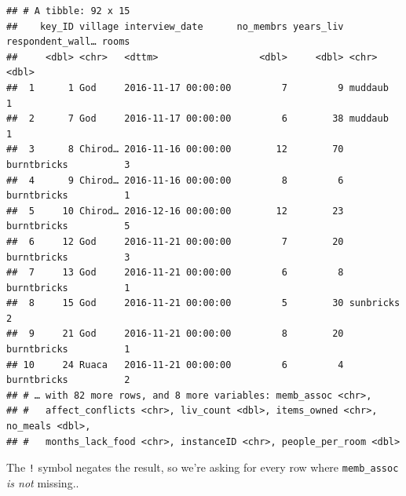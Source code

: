 \documentclass[]{book}
\begin{document}
\begin{verbatim}
## # A tibble: 92 x 15
##    key_ID village interview_date      no_membrs years_liv respondent_wall… rooms
##     <dbl> <chr>   <dttm>                  <dbl>     <dbl> <chr>            <dbl>
##  1      1 God     2016-11-17 00:00:00         7         9 muddaub              1
##  2      7 God     2016-11-17 00:00:00         6        38 muddaub              1
##  3      8 Chirod… 2016-11-16 00:00:00        12        70 burntbricks          3
##  4      9 Chirod… 2016-11-16 00:00:00         8         6 burntbricks          1
##  5     10 Chirod… 2016-12-16 00:00:00        12        23 burntbricks          5
##  6     12 God     2016-11-21 00:00:00         7        20 burntbricks          3
##  7     13 God     2016-11-21 00:00:00         6         8 burntbricks          1
##  8     15 God     2016-11-21 00:00:00         5        30 sunbricks            2
##  9     21 God     2016-11-21 00:00:00         8        20 burntbricks          1
## 10     24 Ruaca   2016-11-21 00:00:00         6         4 burntbricks          2
## # … with 82 more rows, and 8 more variables: memb_assoc <chr>,
## #   affect_conflicts <chr>, liv_count <dbl>, items_owned <chr>, no_meals <dbl>,
## #   months_lack_food <chr>, instanceID <chr>, people_per_room <dbl>
\end{verbatim}

The \texttt{!} symbol negates the result, so we're asking for every row
where \texttt{memb\_assoc} \emph{is not} missing..
\end{document}
